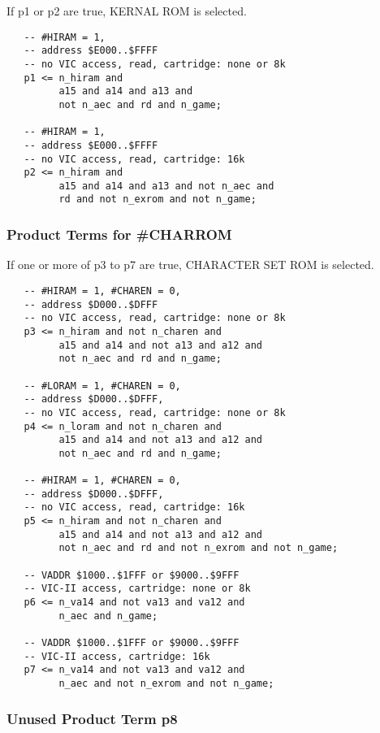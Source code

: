 If p1 or p2 are true, KERNAL ROM is selected.

\begin{lstlisting}
   -- #HIRAM = 1,
   -- address $E000..$FFFF
   -- no VIC access, read, cartridge: none or 8k
   p1 <= n_hiram and
         a15 and a14 and a13 and
         not n_aec and rd and n_game;

   -- #HIRAM = 1,
   -- address $E000..$FFFF
   -- no VIC access, read, cartridge: 16k
   p2 <= n_hiram and
         a15 and a14 and a13 and not n_aec and
         rd and not n_exrom and not n_game;
\end{lstlisting}

\subsubsection{Product Terms for \#CHARROM}

If one or more of p3 to p7 are true, CHARACTER SET ROM is selected.

\begin{lstlisting}
   -- #HIRAM = 1, #CHAREN = 0,
   -- address $D000..$DFFF
   -- no VIC access, read, cartridge: none or 8k
   p3 <= n_hiram and not n_charen and
         a15 and a14 and not a13 and a12 and
         not n_aec and rd and n_game;

   -- #LORAM = 1, #CHAREN = 0,
   -- address $D000..$DFFF,
   -- no VIC access, read, cartridge: none or 8k
   p4 <= n_loram and not n_charen and
         a15 and a14 and not a13 and a12 and
         not n_aec and rd and n_game;

   -- #HIRAM = 1, #CHAREN = 0,
   -- address $D000..$DFFF,
   -- no VIC access, read, cartridge: 16k
   p5 <= n_hiram and not n_charen and
         a15 and a14 and not a13 and a12 and
         not n_aec and rd and not n_exrom and not n_game;

   -- VADDR $1000..$1FFF or $9000..$9FFF
   -- VIC-II access, cartridge: none or 8k
   p6 <= n_va14 and not va13 and va12 and
         n_aec and n_game;

   -- VADDR $1000..$1FFF or $9000..$9FFF
   -- VIC-II access, cartridge: 16k
   p7 <= n_va14 and not va13 and va12 and
         n_aec and not n_exrom and not n_game;
\end{lstlisting}

\subsubsection{Unused Product Term p8}

